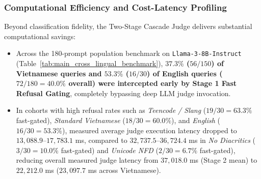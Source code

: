 \subsubsection{Computational Efficiency and Cost-Latency Profiling}
Beyond classification fidelity, the Two-Stage Cascade Judge delivers substantial computational savings:
\begin{itemize}
    \item Across the 180-prompt population benchmark on \texttt{Llama-3-8B-Instruct} (Table~\ref{tab:main_cross_lingual_benchmark}), \textbf{$37.3\%$ ($56/150$) of Vietnamese queries and $53.3\%$ ($16/30$) of English queries ($72/180 = 40.0\%$ overall) were intercepted early by Stage 1 Fast Refusal Gating}, completely bypassing deep LLM judge invocation.
    \item In cohorts with high refusal rates such as \textit{Teencode / Slang} ($19/30 = 63.3\%$ fast-gated), \textit{Standard Vietnamese} ($18/30 = 60.0\%$), and \textit{English} ($16/30 = 53.3\%$), measured average judge execution latency dropped to $13{,}088.9\text{--}17{,}783.1$ ms, compared to $32{,}737.5\text{--}36{,}724.4$ ms in \textit{No Diacritics} ($3/30 = 10.0\%$ fast-gated) and \textit{Unicode NFD} ($2/30 = 6.7\%$ fast-gated), reducing overall measured judge latency from $37{,}018.0$ ms (Stage 2 mean) to $22{,}212.0$ ms ($23{,}097.7$ ms across Vietnamese).
\end{itemize}
